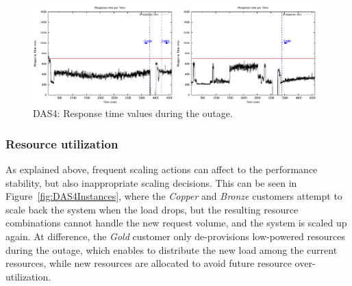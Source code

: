 \begin{figure}[htb]
\begin{minipage}[b]{0.19\linewidth}
	\end{minipage}
\begin{minipage}[b]{0.19\linewidth}
		\vspace{-3mm}
		\includegraphics[width=\linewidth,height=3.8cm]{images/exps2011/medium_up/das/proxyDataPoints_output.eps}
	\end{minipage}
\begin{minipage}[b]{0.19\linewidth}
		\vspace{-3mm}
		\includegraphics[width=\linewidth,height=3.8cm]{images/exps2011/high/das/proxyDataPoints_output.eps}
	\end{minipage}
\vspace{-3mm}
\caption{DAS4: Response time values during the outage.}
\label{fig:DAS4ResponseTime}
\end{figure}


\subsubsection{Resource utilization}

As explained above, frequent scaling actions can affect to the performance stability, but also inappropriate scaling decisions. This can be seen in Figure~\ref{fig:DAS4Instances}, where the \emph{Copper} and \emph{Bronze} customers attempt to scale back the system when the load drops, but the resulting resource combinations cannot handle the new request volume, and the system is scaled up again.  At difference, the \emph{Gold} customer only de-provisions low-powered resources during the outage, which enables to distribute the new load among the current resources, while new resources are allocated to avoid future resource over-utilization. 


